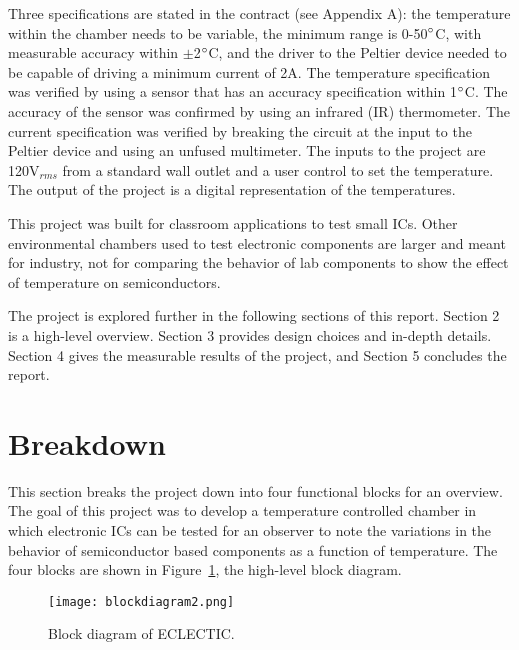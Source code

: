 \documentclass[11pt,letter]{article}
\begin{document}
Three specifications are stated in the contract (see Appendix A): the temperature within the chamber needs to be variable, the minimum range is 0-50$\degree$C, with measurable accuracy within $\pm$2$\degree$C, and the driver to the Peltier device needed to be capable of driving a minimum current of 2A. The temperature specification was verified by using a sensor that has an accuracy specification within 1$\degree$C. The accuracy of the sensor was confirmed by using an infrared (IR) thermometer. The current specification was verified by breaking the circuit at the input to the Peltier device and using an unfused multimeter. The inputs to the project are 120V$_{rms}$ from a standard wall outlet and a user control to set the temperature. The output of the project is a digital representation of the temperatures.   

This project was built for classroom applications to test small ICs. Other environmental chambers used to test electronic components are larger and meant for industry, not for comparing the behavior of lab components to show the effect of temperature on semiconductors. 

The project is explored further in the following sections of this report. Section 2 is a high-level overview. Section 3 provides design choices and in-depth details. Section 4 gives the measurable results of the project, and Section 5 concludes the report.
\section{Breakdown} %
This section breaks the project down into four functional blocks for an overview. The goal of this project was to develop a temperature controlled chamber in which electronic ICs can be tested for an observer to note the variations in the behavior of semiconductor based components as a function of temperature. The four blocks are shown in Figure~\ref{fig:blockdiagram}, the high-level block diagram.

\begin{figure}[H]
    \centering
    \texttt{[image: blockdiagram2.png]}
    \caption{Block diagram of ECLECTIC.}
    \label{fig:blockdiagram}
\end{figure}
\end{document}
